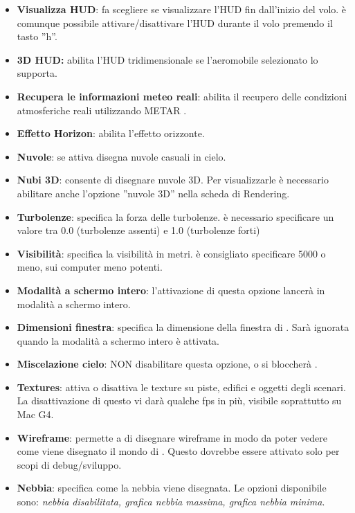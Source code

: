 {\begin{itemize}
\item \textbf{Visualizza HUD}: fa scegliere se visualizzare l'HUD fin dall'inizio del volo. \`{e} comunque possibile attivare/disattivare l'HUD durante il volo premendo il tasto ''h''.
\item \textbf{3D HUD:} abilita l'HUD tridimensionale se l'aeromobile selezionato lo supporta.
\item \textbf{Recupera le informazioni meteo reali}: abilita il recupero delle condizioni atmosferiche reali utilizzando METAR .
\item \textbf{Effetto Horizon}: abilita l'effetto orizzonte.
\item \textbf{Nuvole}: se attiva disegna nuvole casuali in cielo.
\item \textbf{Nubi 3D}: consente di disegnare nuvole 3D. Per visualizzarle \`{e} necessario abilitare anche l'opzione ''nuvole 3D'' nella scheda di Rendering.
\item \textbf{Turbolenze}: specifica la forza delle turbolenze. \`{e} necessario specificare un valore tra 0.0 (turbolenze assenti) e 1.0 (turbolenze forti)
\item \textbf{Visibilit\`{a}}: specifica la visibilit\`{a} in metri. \`{e} consigliato specificare 5000 o meno, sui computer meno potenti.
\item \textbf{Modalit\`{a} a schermo intero}: l'attivazione di questa opzione lancer\`{a} \FlightGear{} in modalit\`{a} a schermo intero.
\item \textbf{Dimensioni finestra}: specifica la dimensione della finestra di \FlightGear{}. Sar\`{a} ignorata quando la modalit\`{a} a schermo intero \`{e} attivata.
\item \textbf{Miscelazione cielo}: NON disabilitare questa opzione, o si bloccher\`{a} \FlightGear{}.
\item \textbf{Textures}: attiva o disattiva le texture su piste, edifici e oggetti degli scenari. La disattivazione di questo vi dar\`{a} qualche fps in pi\`{u}, visibile soprattutto su Mac G4.
\item \textbf{Wireframe}: permette a \FlightGear{} di disegnare wireframe in modo da poter vedere come viene disegnato il mondo di \FlightGear{}. Questo dovrebbe essere attivato solo per scopi di debug/sviluppo.
\item \textbf{Nebbia}: specifica come la nebbia viene disegnata. Le opzioni disponibile sono: \textit{nebbia disabilitata, grafica nebbia massima, grafica nebbia minima}.
\end{itemize}
}{}

